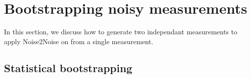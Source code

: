 




\newpage
\section{Bootstrapping noisy measurements}

In this section, we discuss how to generate two independant measurements to apply Noise2Noise on from a single measurement.

\subsection{Statistical bootstrapping}


